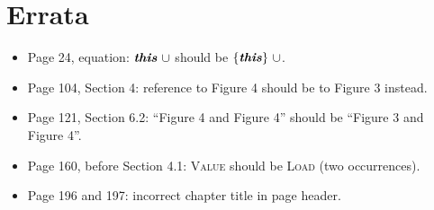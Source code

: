 \documentclass[letterpaper,12pt]{article}
\begin{document}
\thispagestyle{empty}
\section*{Errata}
\begin{itemize}
  \item Page 24, equation: $\textbf{\emph{this}}~\cup$ should be $\{ \textbf{\emph{this}} \}~\cup$.
  \item Page 104, Section 4: reference to Figure 4 should be to Figure 3 instead.
  \item Page 121, Section 6.2: ``Figure 4 and Figure 4'' should be ``Figure 3 and Figure 4''.
  \item Page 160, before Section 4.1: \textsc{Value} should be \textsc{Load} (two occurrences).
  \item Page 196 and 197: incorrect chapter title in page header.
\end{itemize}
\end{document}
